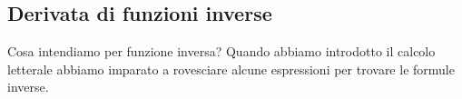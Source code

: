 \subsection{Derivata di funzioni inverse}
\label{subsec:differenziazione_derivatainverse}
Cosa intendiamo per funzione inversa? 
Quando abbiamo introdotto il calcolo letterale abbiamo imparato a 
rovesciare alcune espressioni per trovare le formule inverse.


% 
% 
